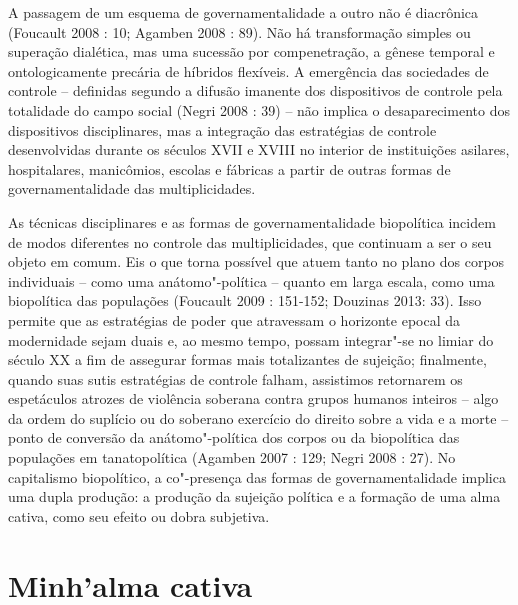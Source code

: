 A passagem de um esquema de governamentalidade a outro não é diacrônica
(Foucault 2008 : 10; Agamben 2008 : 89). Não há transformação simples ou
superação dialética, mas uma sucessão por compenetração, a gênese
temporal e ontologicamente precária de híbridos flexíveis. A emergência
das sociedades de controle -- definidas segundo a difusão imanente dos
dispositivos de controle pela totalidade do campo social (Negri 2008 :
39) -- não implica o desaparecimento dos dispositivos disciplinares, mas
a integração das estratégias de controle desenvolvidas durante os
séculos XVII e XVIII no interior de instituições asilares, hospitalares,
manicômios, escolas e fábricas a partir de outras formas de
governamentalidade das multiplicidades.

As técnicas disciplinares e as formas de governamentalidade biopolítica
incidem de modos diferentes no controle das multiplicidades, que
continuam a ser o seu objeto em comum. Eis o que torna possível que
atuem tanto no plano dos corpos individuais -- como uma anátomo"-política
-- quanto em larga escala, como uma biopolítica das populações (Foucault
2009 : 151-152; Douzinas 2013: 33). Isso permite que as estratégias de
poder que atravessam o horizonte epocal da modernidade sejam duais e, ao
mesmo tempo, possam integrar"-se no limiar do século XX a fim de
assegurar formas mais totalizantes de sujeição; finalmente, quando suas
sutis estratégias de controle falham, assistimos retornarem os
espetáculos atrozes de violência soberana contra grupos humanos inteiros
-- algo da ordem do suplício ou do soberano exercício do direito sobre a
vida e a morte -- ponto de conversão da anátomo"-política dos corpos ou
da biopolítica das populações em tanatopolítica (Agamben 2007 : 129;
Negri 2008 : 27). No capitalismo biopolítico, a co"-presença das formas
de governamentalidade implica uma dupla produção: a produção da sujeição
política e a formação de uma alma cativa, como seu efeito ou dobra
subjetiva.

\section{Minh'alma cativa}

